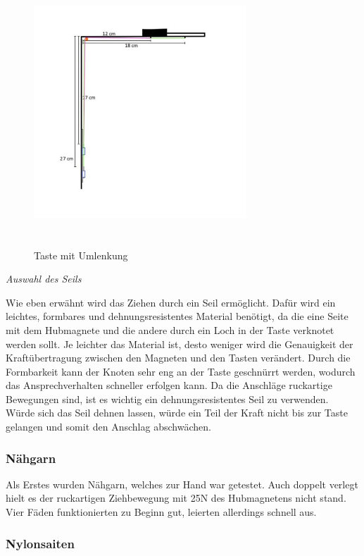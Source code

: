 \begin{figure}[htbp]
	\centering
	\includegraphics [width=8cm, height=10cm] {img/mitUmlenkung_locker}
	\caption{Taste mit Umlenkung}
	\label{<label>}
\end{figure}


\textit{Auswahl des Seils}

Wie eben erwähnt wird das Ziehen durch ein Seil ermöglicht.
Dafür wird ein leichtes, formbares und dehnungsresistentes Material benötigt, da die eine Seite mit dem Hubmagnete und die andere durch ein Loch in der Taste verknotet werden sollt.
Je leichter das Material ist, desto weniger wird die Genauigkeit der Kraftübertragung zwischen den Magneten und den Tasten verändert.
Durch die Formbarkeit kann der Knoten sehr eng an der Taste geschnürrt werden, wodurch das Ansprechverhalten schneller erfolgen kann.
Da die Anschläge ruckartige Bewegungen sind, ist es wichtig ein dehnungsresistentes Seil zu verwenden.
Würde sich das Seil dehnen lassen, würde ein Teil der Kraft nicht bis zur Taste gelangen und somit den Anschlag abschwächen.

\subsubsection{Nähgarn}

Als Erstes wurden Nähgarn, welches zur Hand war getestet.
Auch doppelt verlegt hielt es der ruckartigen Ziehbewegung mit 25N des Hubmagnetens nicht stand.
Vier Fäden funktionierten zu Beginn gut, leierten allerdings schnell aus.

\subsubsection{Nylonsaiten}

